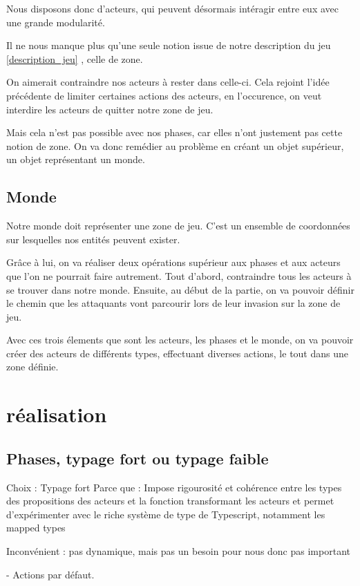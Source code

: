 \documentclass{article}
\begin{document}
Nous disposons donc d'acteurs, qui peuvent désormais intéragir entre eux avec 
une grande modularité.

Il ne nous manque plus qu'une seule notion issue de notre description du jeu 
\ref{description_jeu} , celle de zone.

On aimerait contraindre nos acteurs à rester dans celle-ci. Cela 
rejoint l'idée précédente de limiter certaines actions des acteurs, en l'occurence, 
on veut interdire les acteurs de quitter notre zone de jeu.

Mais cela n'est pas possible avec nos phases, car elles n'ont justement pas 
cette notion de zone.
On va donc remédier au problème en créant un objet supérieur, un objet représentant 
un monde.

\subsection{Monde}

Notre monde doit représenter une zone de jeu.
C'est un ensemble de coordonnées sur lesquelles nos entités peuvent exister.

Grâce à lui, on va réaliser deux opérations supérieur aux phases et aux acteurs que 
l'on ne pourrait faire autrement.
Tout d'abord, contraindre tous les acteurs à se trouver dans notre monde.
Ensuite, au début de la partie, on va pouvoir définir le chemin que 
les attaquants vont parcourir lors de leur invasion sur la zone de jeu.

Avec ces trois élements que sont les acteurs, les phases et le monde, on va pouvoir 
créer des acteurs de différents types, effectuant diverses actions, le tout dans une 
zone définie.

\section{réalisation}
\subsection{Phases, typage fort ou typage faible}
Choix : Typage fort
Parce que : Impose rigourosité et cohérence entre les types des propositions des 
acteurs et la fonction transformant les acteurs et permet d'expérimenter avec 
le riche système de type de Typescript, notamment les mapped types

Inconvénient : pas dynamique, mais pas un besoin pour nous donc pas important

- Actions par défaut.
\end{document}
